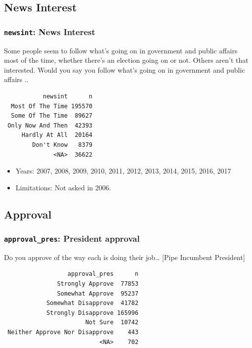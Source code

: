 \documentclass[10pt,article,oneside]{memoir}
\theoremstyle{definition}
\begin{document}
\hypertarget{news-interest}{%
\subsection{News Interest}\label{news-interest}}

\hypertarget{newsint-news-interest}{%
\subsubsection{\texorpdfstring{\texttt{newsint}: News
Interest}{newsint: News Interest}}\label{newsint-news-interest}}

Some people seem to follow what's going on in government and public
affairs most of the time, whether there's an election going on or not.
Others aren't that interested. Would you say you follow what's going on
in government and public affairs ..

\begin{verbatim}
           newsint      n
  Most Of The Time 195570
  Some Of The Time  89627
 Only Now And Then  42393
     Hardly At All  20164
        Don't Know   8379
              <NA>  36622
\end{verbatim}

\begin{itemize}
\tightlist
\item
  Years: 2007, 2008, 2009, 2010, 2011, 2012, 2013, 2014, 2015, 2016,
  2017
\item
  Limitations: Not asked in 2006.
\end{itemize}

\hypertarget{approval}{%
\subsection{Approval}\label{approval}}

\hypertarget{approval_pres-president-approval}{%
\subsubsection{\texorpdfstring{\texttt{approval\_pres}: President
approval}{approval\_pres: President approval}}\label{approval_pres-president-approval}}

Do you approve of the way each is doing their job\ldots{} {[}Pipe
Incumbent President{]}

\begin{verbatim}
                  approval_pres      n
               Strongly Approve  77853
               Somewhat Approve  95237
            Somewhat Disapprove  41782
            Strongly Disapprove 165996
                       Not Sure  10742
 Neither Approve Nor Disapprove    443
                           <NA>    702
\end{verbatim}
\end{document}
